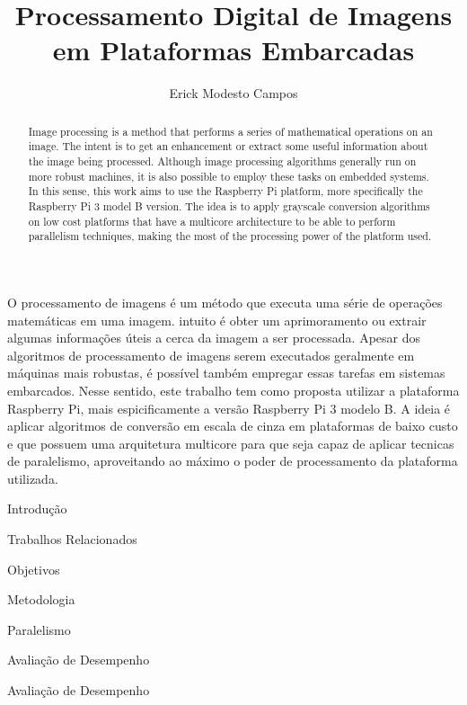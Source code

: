 \documentclass[12pt]{article}
\title{Processamento Digital de Imagens em Plataformas Embarcadas}
\author{Erick Modesto Campos}
\begin{document}
 

\onehalfspace
\maketitle

\begin{abstract}
Image processing is a method that performs a series of mathematical operations
on an image. The intent is to get an enhancement or extract some useful
information about the image being processed. Although image processing
algorithms generally run on more robust machines, it is also possible to employ
these tasks on embedded systems. In this sense, this work aims to use the
Raspberry Pi platform, more specifically the Raspberry Pi 3 model B version. The
idea is to apply grayscale conversion algorithms on low cost platforms that have
a multicore architecture to be able to perform parallelism techniques, making
the most of the processing power of the platform used.
\end{abstract}
     
\begin{resumo} 
O processamento de imagens é um método que executa uma série de operações
matemáticas em uma imagem.  intuito é obter um aprimoramento ou extrair algumas
informações úteis a cerca da imagem a ser processada. Apesar dos algoritmos de
processamento de imagens serem executados geralmente em máquinas mais robustas,
é possível também empregar essas tarefas em sistemas embarcados.  Nesse sentido,
este trabalho tem como proposta utilizar a plataforma Raspberry Pi, mais
espicificamente a versão Raspberry Pi 3 modelo B. A ideia é aplicar algoritmos
de conversão em escala de cinza em plataformas de baixo custo e que possuem uma
arquitetura multicore para que seja capaz de aplicar tecnicas de paralelismo,
aproveitando ao máximo o poder de processamento da plataforma utilizada.
\end{resumo}

\begin{section}{Introdução}

\end{section}
\begin{section}{Trabalhos Relacionados}

\end{section}
\begin{section}{Objetivos}

\end{section}
\begin{section}{Metodologia}

\end{section}
\begin{section}{Paralelismo}

\end{section}
\begin{section}{Avaliação de Desempenho}

\end{section}
\begin{section}{Avaliação de Desempenho}

\end{section}



\end{document}
